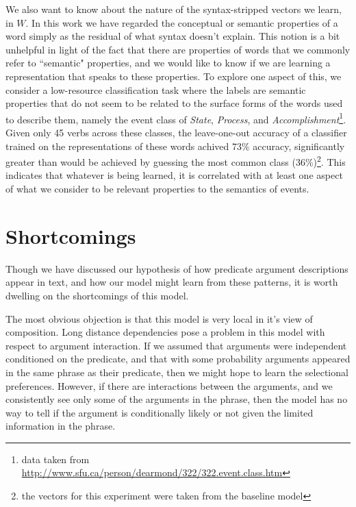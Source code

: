 \documentclass[11pt,letterpaper]{article}
\begin{document}
%
%

We also want to know about the nature of the syntax-stripped vectors we learn, in $W$.
In this work we have regarded the conceptual or semantic properties of a word simply as
the residual of what syntax doesn't explain. This notion is a bit unhelpful in light
of the fact that there are properties of words that we commonly refer to ``semantic" properties,
and we would like to know if we are learning a representation that speaks to these properties.
To explore one aspect of this, we consider a low-resource classification task where
the labels are semantic properties that do not seem to be related to the surface forms
of the words used to describe them, namely the event class of {\em State}, {\em Process},
and {\em Accomplishment}\footnote{data taken from \url{http://www.sfu.ca/person/dearmond/322/322.event.class.htm}}.
Given only 45 verbs across these classes, the leave-one-out accuracy of a classifier trained
on the representations of these words achived 73\% accuracy, significantly greater than would
be achieved by guessing the most common class (36\%)\footnote{the vectors for this experiment
were taken from the baseline model}.
This indicates that whatever is being learned, it is correlated with at least one aspect of
what we consider to be relevant properties to the semantics of events.





\section{Shortcomings} %
\label{section:unlearnability}
Though we have discussed our hypothesis of how predicate argument descriptions
appear in text, and how our model might learn from these patterns, it is worth
dwelling on the shortcomings of this model.

The most obvious objection is that this model is very local in it's view of composition.
Long distance dependencies pose a problem in this model with respect to argument
interaction. If we assumed that arguments were independent conditioned on the predicate,
and that with some probability arguments appeared in the same phrase as their predicate,
then we might hope to learn the selectional preferences. However, if there are interactions
between the arguments, and we consistently see only some of the arguments in the phrase,
then the model has no way to tell if the argument is conditionally likely or not given
the limited information in the phrase.
\end{document}
